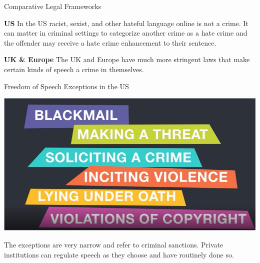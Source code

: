 \documentclass[nobackground,dvipsnames,table]{beamer}
\begin{document}
\begin{frame}{Comparative Legal Frameworks}

\textbf{US} \newline \newline  
In the US racist, sexist, and other hateful language online is not a crime. It can matter in criminal settings to categorize another crime as a hate crime and the offender may receive a hate crime enhancement to their sentence. \newline 

\textbf{UK \& Europe} \newline \newline 
The UK and Europe have much more stringent laws that make certain kinds of speech a crime in themselves. 

\end{frame}



\begin{frame}{Freedom of Speech Exceptions in the US}

\begin{center}
    \includegraphics[width=\textwidth]{img/fig5.jpg} \newline   
\end{center}

The exceptions are very narrow and refer to criminal sanctions. Private institutions can regulate speech as they choose and have routinely done so.

\end{frame}
\end{document}
